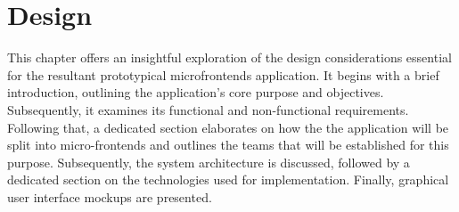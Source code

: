 \chapter{Design}
\label{chap:Design} 
This chapter offers an insightful exploration of the design considerations essential for the resultant prototypical microfrontends application. It begins with a brief introduction, outlining the application's core purpose and objectives. Subsequently, it examines its functional and non-functional requirements. Following that, a dedicated section elaborates on how the the application will be split into micro-frontends and outlines the teams that will be established for this purpose. Subsequently, the system architecture is discussed, followed by a dedicated section on the technologies used for implementation. Finally, graphical user interface mockups are presented.






